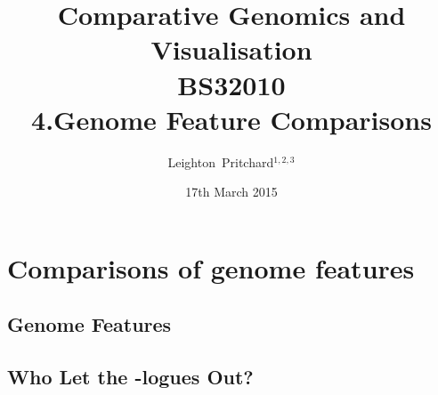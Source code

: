 

%



\title[Comparative Genomics and Visualisation: 4.Genome Features] %
{Comparative Genomics and \\ Visualisation \\
BS32010 \\
4.Genome Feature Comparisons}
\author[Pritchard] %
{Leighton~Pritchard$^{1,2,3}$}
\date[17th March 2015] %
{17th March 2015}
\subject{Bioinformatics, Genomics, Bacteria, Sequencing, Microbiology, Microbes, Comparative Genomics, Visualisation}





\frame[plain]{\titlepage}



\section{Comparisons of genome features}
\subsection{Genome Features}


\subsection{Who Let the -logues Out?}


